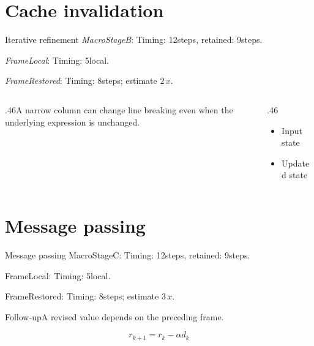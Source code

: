 \documentclass[9pt,aspectratio=169]{beamer}
\newcommand{\fuzzlayerA}[1]{\textit{#1}}
\newcommand{\fuzzlayerB}[1]{\fuzzlayerA{#1}}
\newcommand{\fuzzterm}[1]{\fuzzlayerB{#1}}
\newcommand{\fuzzpair}[2]{\fuzzterm{#1}: #2}
\newcommand{\fuzzunit}{steps}
\let\fuzzoriginalunit\fuzzunit
\newcommand{\fuzzcoefficient}{2}
\newcommand{\fuzzscale}[2][\fuzzcoefficient]{#1\,#2}
\begin{document}
\section{Cache invalidation}
\begin{frame}[t]{Iterative refinement}
\fuzzpair{MacroStageB}{Timing: 12\fuzzunit, retained: 9\fuzzoriginalunit.}\par
{\renewcommand{\fuzzunit}{local}\fuzzpair{FrameLocal}{Timing: 5\fuzzunit.}\par}
\fuzzpair{FrameRestored}{Timing: 8\fuzzunit; estimate $\fuzzscale{x}$.}\par
\begin{columns}[T]\begin{column}{.46\textwidth}A narrow column can change line breaking even when the underlying expression is unchanged.\end{column}\begin{column}{.46\textwidth}\begin{itemize}\item Input state\item Updated state\end{itemize}\end{column}\end{columns}
\end{frame}
\renewcommand{\fuzzunit}{steps}
\renewcommand{\fuzzcoefficient}{3}
\renewcommand{\fuzzterm}[1]{{\textrm{#1}}}
\section{Message passing}
\begin{frame}[t]{Message passing}
\fuzzpair{MacroStageC}{Timing: 12\fuzzunit, retained: 9\fuzzoriginalunit.}\par
{\renewcommand{\fuzzunit}{local}\fuzzpair{FrameLocal}{Timing: 5\fuzzunit.}\par}
\fuzzpair{FrameRestored}{Timing: 8\fuzzunit; estimate $\fuzzscale{x}$.}\par
\begin{block}{Follow-up}\fuzzterm{A revised value} depends on the preceding frame.\end{block}
\[r_{k+1}=r_k-\alpha d_k\]
\end{frame}
\end{document}
